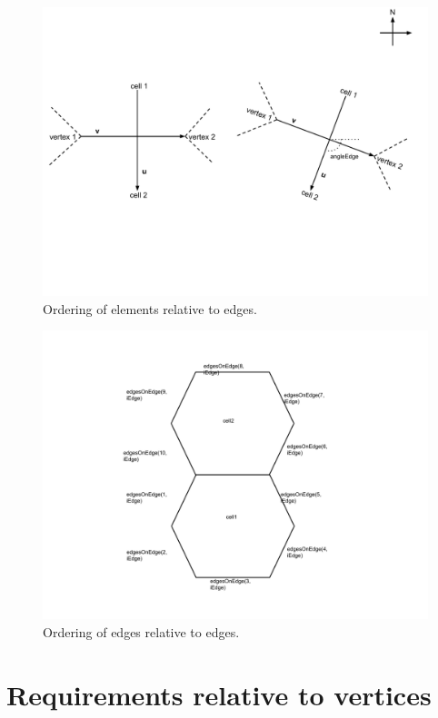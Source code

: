 \documentclass[11pt]{report}
\begin{document}
\begin{figure}[htp!]
	\centering
	\includegraphics[scale=0.4]{figures/EdgeDiagram.pdf}
	\caption{Ordering of elements relative to edges.}
\end{figure}

\begin{figure}[htp!]
	\centering
	\includegraphics[scale=0.4]{figures/EdgeOnEdgeDiagram.pdf}
	\caption{Ordering of edges relative to edges.}
\end{figure}

\section{Requirements relative to vertices}
\end{document}
